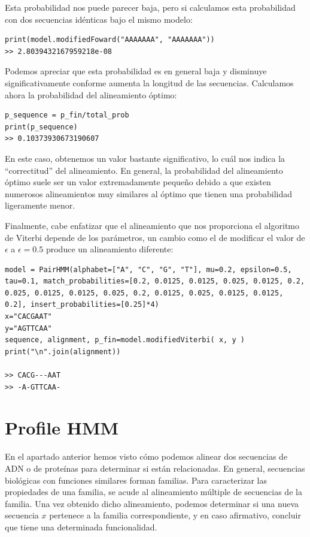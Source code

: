\begin{exampleth}
Esta probabilidad nos puede parecer baja, pero si calculamos esta probabilidad con dos secuencias idénticas bajo el mismo modelo:
\begin{verbatim}
print(model.modifiedFoward("AAAAAAA", "AAAAAAA"))
>> 2.8039432167959218e-08
\end{verbatim}

Podemos apreciar que esta probabilidad es en general baja y disminuye significativamente conforme aumenta la longitud de las secuencias. Calculamos ahora la probabilidad del alineamiento óptimo:
\begin{verbatim}
p_sequence = p_fin/total_prob
print(p_sequence)
>> 0.10373930673190607
\end{verbatim}
En este caso, obtenemos un valor bastante significativo, lo cuál nos indica la \enquote{correctitud} del alineamiento. En general, la probabilidad del alineamiento óptimo suele ser un valor extremadamente pequeño debido a que existen numerosos alineamientos muy similares al óptimo que tienen una probabilidad ligeramente menor.

Finalmente, cabe enfatizar que el alineamiento que nos proporciona el algoritmo de Viterbi depende de los parámetros, un cambio como el de modificar el valor de $\epsilon$ a $\epsilon=0.5$ produce un alineamiento diferente:

\begin{verbatim}
model = PairHMM(alphabet=["A", "C", "G", "T"], mu=0.2, epsilon=0.5, tau=0.1, match_probabilities=[0.2, 0.0125, 0.0125, 0.025, 0.0125, 0.2, 0.025, 0.0125, 0.0125, 0.025, 0.2, 0.0125, 0.025, 0.0125, 0.0125, 0.2], insert_probabilities=[0.25]*4)
x="CACGAAT"
y="AGTTCAA"
sequence, alignment, p_fin=model.modifiedViterbi( x, y )
print("\n".join(alignment))

>> CACG---AAT
>> -A-GTTCAA-
\end{verbatim}
\end{exampleth}

\section{Profile HMM}
En el apartado anterior hemos visto cómo podemos alinear dos secuencias de ADN o de proteínas para determinar si están relacionadas. En general, secuencias biológicas con funciones similares forman familias. Para caracterizar las propiedades de una familia, se acude al alineamiento múltiple de secuencias de la familia. Una vez obtenido dicho alineamiento, podemos determinar si una nueva secuencia $x$ pertenece a la familia correspondiente, y en caso afirmativo, concluir que tiene una determinada funcionalidad. 

